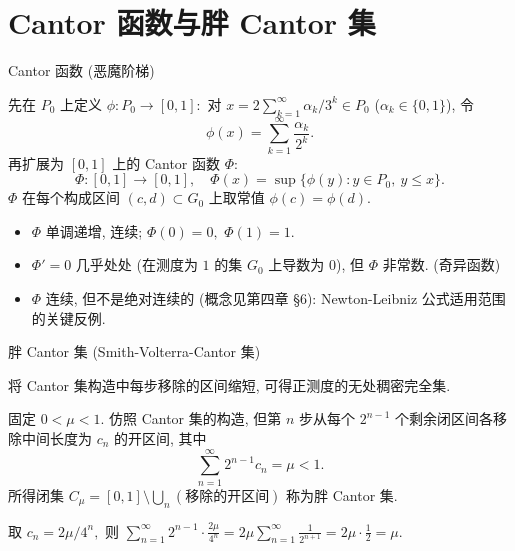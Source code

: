 
\section[Cantor 函数]{Cantor 函数与胖 Cantor 集}


\begin{frame}{Cantor 函数 (恶魔阶梯)}

\begin{Def}[Cantor 函数]
先在 $P_0$ 上定义 $\phi: P_0 \to [0,1]:$ 对 $x = 2\sum_{k=1}^\infty \alpha_k/3^k \in P_0$
($\alpha_k \in \{0,1\}$), 令
\[
  \phi(x) = \sum_{k=1}^{\infty} \frac{\alpha_k}{2^k}.
\]
再扩展为 $[0,1]$ 上的 \alert{Cantor 函数} $\Phi:$
\[
  \Phi: [0,1] \to [0,1], \quad \Phi(x) = \sup\bigl\{\phi(y) : y \in P_0,\ y \leqslant x\bigr\}.
\]
$\Phi$ 在每个构成区间 $(c, d) \subset G_0$ 上取常值 $\phi(c) = \phi(d).$
\end{Def}

\pause

\begin{prop}
\begin{itemize}
\item $\Phi$ 单调递增, 连续; $\Phi(0) = 0,$ $\Phi(1) = 1.$
\item $\Phi' = 0$ 几乎处处 (在测度为 $1$ 的集 $G_0$ 上导数为 $0$), 但 $\Phi$ 非常数. (\alert{奇异函数})
\item $\Phi$ 连续, 但\alert{不是绝对连续的} (概念见第四章 §6): Newton-Leibniz 公式适用范围的关键反例.
\end{itemize}
\end{prop}

\end{frame}


\begin{frame}{胖 Cantor 集 (Smith-Volterra-Cantor 集)}

将 Cantor 集构造中每步移除的区间缩短, 可得\alert{正测度}的无处稠密完全集.

\pause

\begin{Def}[胖 Cantor 集]
固定 $0 < \mu < 1.$ 仿照 Cantor 集的构造, 但第 $n$ 步从每个 $2^{n-1}$ 个剩余闭区间各移除中间长度为 $c_n$ 的开区间, 其中
\[
\sum_{n=1}^{\infty} 2^{n-1} c_n = \mu < 1.
\]
所得闭集 $C_\mu = [0,1] \setminus \bigcup_n (\text{移除的开区间})$ 称为\alert{胖 Cantor 集}.
\end{Def}

\pause
\vspace{0.5em}

\begin{eg}
取 $c_n = 2\mu/4^n,$ 则
$\displaystyle\sum_{n=1}^\infty 2^{n-1} \cdot \frac{2\mu}{4^n}
= 2\mu \sum_{n=1}^\infty \frac{1}{2^{n+1}} = 2\mu \cdot \frac{1}{2} = \mu.$
\end{eg}

\end{frame}

